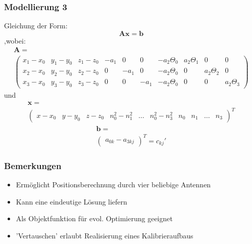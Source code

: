 \begin{frame}
  	\frametitle{Modellierung 3}
	Gleichung der Form:
	\[\mathbf{A}\mathbf{x}=\mathbf{b}\]  
	,wobei:
	\begin{multline}
	\mathbf{A}=\\
	\left(
		\begin{array}{cccccccccc}
			x_1-x_0 & y_1-y_0 & z_1-z_0 & -a_1 & 0 & 0 & -a_2\Theta_0 & a_2\Theta_1 & 0 & 0 \\
			x_2-x_0 & y_2-y_0 & z_2-z_0 & 0 & -a_1 & 0 & -a_2\Theta_0& 0 & a_2\Theta_2 & 0 \\
			x_3-x_0 & y_3-y_0 & z_3-z_0 & 0 & 0 & -a_1 & -a_2\Theta_0& 0 & 0 & a_2\Theta_3
		\end{array}
	\right) \nonumber
	\end{multline}
	und
	\begin{multline}
	\mathbf{x}=\\
	\left(
		\begin{array}{cccccccccc}
			x-x_0 & y-y_0 & z-z_0 &	n_0^2-n_1^2	& \dots	& n_0^2-n_3^2 & n_0 & n_1 & \dots &	n_3	
		\end{array}
	\right)^T\nonumber
	\end{multline}
	\begin{multline}
		\mathbf{b}=\\
		\left(
			\begin{array}{c}
				a_{0k}-a_{3kj} 
			\end{array}
			\right)^T
			= c_{kj}'\nonumber
		\end{multline}
\end{frame}
\begin{frame}
%
  	\frametitle{Bemerkungen}
  	\begin{itemize}
		\item Ermöglicht Positionsberechnung durch vier beliebige Antennen 
		\item Kann eine eindeutige Lösung liefern
		\item Als Objektfunktion für evol. Optimierung geeignet
		\item 'Vertauschen' erlaubt Realisierung eines Kalibrieraufbaus
  	\end{itemize}
%  	
\end{frame}